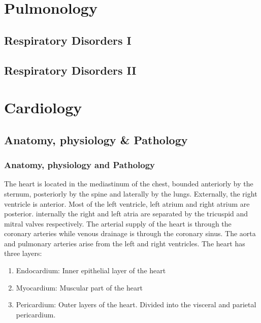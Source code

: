 \documentclass[
  letterpaper,
  DIV=11,
  numbers=noendperiod]{scrreprt}
\providecommand{\tightlist}{%
  \setlength{\itemsep}{0pt}\setlength{\parskip}{0pt}}\usepackage{longtable,booktabs,array}
\begin{document}
\part{{Pulmonology}}

\hypertarget{respiratory-disorders-i}{%
\chapter{Respiratory Disorders I}\label{respiratory-disorders-i}}

\hypertarget{respiratory-disorders-ii}{%
\chapter{Respiratory Disorders II}\label{respiratory-disorders-ii}}

\part{{Cardiology}}

\hypertarget{anatomy-physiology-pathology}{%
\chapter{Anatomy, physiology \&
Pathology}\label{anatomy-physiology-pathology}}

\hypertarget{anatomy-physiology-and-pathology}{%
\section{Anatomy, physiology and
Pathology}\label{anatomy-physiology-and-pathology}}

The heart is located in the mediastinum of the chest, bounded anteriorly
by the sternum, posteriorly by the spine and laterally by the lungs.
Externally, the right ventricle is anterior. Most of the left ventricle,
left atrium and right atrium are posterior. internally the right and
left atria are separated by the tricuspid and mitral valves
respectively. The arterial supply of the heart is through the coronary
arteries while venous drainage is through the coronary sinus. The aorta
and pulmonary arteries arise from the left and right ventricles. The
heart has three layers:

\begin{enumerate}
\def\labelenumi{\arabic{enumi}.}
\tightlist
\item
  Endocardium: Inner epithelial layer of the heart
\item
  Myocardium: Muscular part of the heart
\item
  Pericardium: Outer layers of the heart. Divided into the visceral and
  parietal pericardium.
\end{enumerate}
\end{document}
